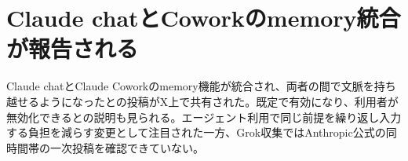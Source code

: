 \section{Claude chatとCoworkのmemory統合が報告される}
Claude chatとClaude Coworkのmemory機能が統合され、両者の間で文脈を持ち越せるようになったとの投稿がX上で共有された。既定で有効になり、利用者が無効化できるとの説明も見られる。エージェント利用で同じ前提を繰り返し入力する負担を減らす変更として注目された一方、Grok収集ではAnthropic公式の同時間帯の一次投稿を確認できていない。
